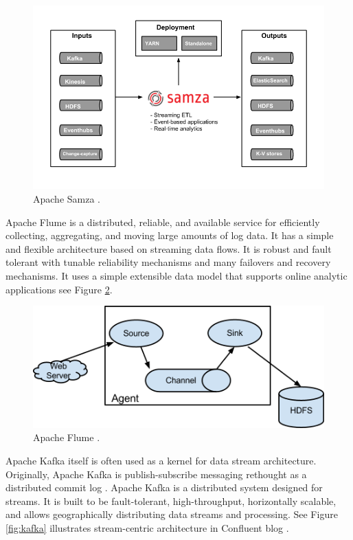 \documentclass[twoside,12pt, a4paper]{report}
\begin{document}
\begin{figure}[!h]
	\centering
	\includegraphics[width=1\linewidth]{figures/samza-arch4.png}
	\caption{Apache Samza \cite{samza}.}
	\label{fig:samza}
\end{figure}



Apache Flume \cite{flume} is a distributed, reliable, and available
service for efficiently collecting, aggregating, and moving
large amounts of log data. It has a simple and flexible
architecture based on streaming data flows. It is robust and
fault tolerant with tunable reliability mechanisms and many
failovers and recovery mechanisms. It uses a simple
extensible data model that supports online analytic
applications see Figure \ref{fig:flume}.

\begin{figure}[!h]
	\centering
	\includegraphics[width=1\linewidth]{figures/DevGuide_image00.png}
	\caption{Apache Flume \cite{flume}.}
	\label{fig:flume}
\end{figure}


Apache Kafka itself is often used as a kernel for data stream
architecture. Originally, Apache Kafka is publish-subscribe
messaging rethought as a distributed commit log \cite{ApacheKA}.
Apache Kafka is a distributed system designed for streams.
It is built to be fault-tolerant, high-throughput, horizontally
scalable, and allows geographically distributing data streams
and processing. See Figure \ref{fig:kafka} illustrates stream-centric
architecture in Confluent blog  \cite{Kafka}.
\end{document}
